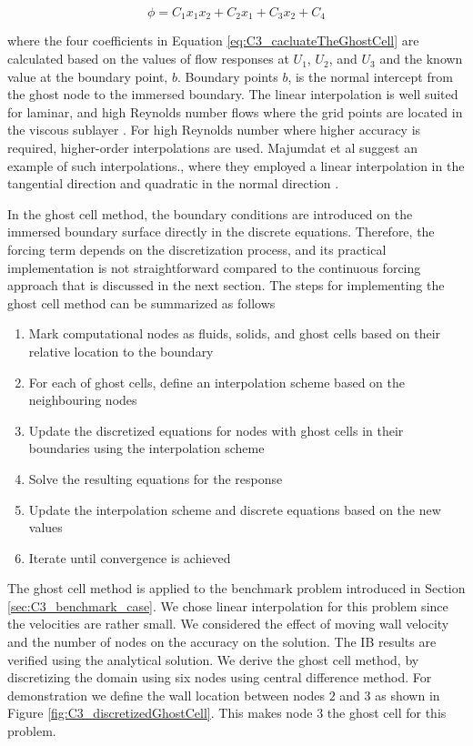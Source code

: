 \begin{equation}\label{eq:C3_cacluateTheGhostCell}
    \phi = C_1 x_1 x_2 + C_2 x_1 + C_3 x_2 + C_4
\end{equation}

where the four coefficients in Equation \eqref{eq:C3_cacluateTheGhostCell} are calculated based on the values of flow responses at $U_1$, $U_2$, and $U_3$ and the known value at the boundary point, $b$. Boundary points $b$, is the normal intercept from the ghost node to the immersed boundary. The linear interpolation is well suited for laminar, and high Reynolds number flows where the grid points are located in the viscous sublayer \cite{iaccarino2003immersed}. For high Reynolds number where higher accuracy is required, higher-order interpolations are used. Majumdat et al suggest an example of such interpolations., where they employed a linear interpolation in the tangential direction and quadratic in the normal direction \cite{majumdar2001rans}. 

In the ghost cell method, the boundary conditions are introduced on the immersed boundary surface directly in the discrete equations. Therefore, the forcing term depends on the discretization process, and its practical implementation is not straightforward compared to the continuous forcing approach that is discussed in the next section. The steps for implementing the ghost cell method can be summarized as follows

\begin{enumerate}
    \item Mark computational nodes as fluids, solids, and ghost cells based on their relative location to the boundary
    \item For each of ghost cells, define an interpolation scheme based on the neighbouring nodes
    \item Update the discretized equations for nodes with ghost cells in their boundaries using the interpolation scheme
    \item Solve the resulting equations for the response
    \item Update the interpolation scheme and discrete equations based on the new values
    \item Iterate until convergence is achieved
\end{enumerate}

The ghost cell method is applied to the benchmark problem introduced in Section \ref{sec:C3_benchmark_case}. We chose linear interpolation for this problem since the velocities are rather small. We considered the effect of moving wall velocity and the number of nodes on the accuracy on the solution. The IB results are verified using the analytical solution. We derive the ghost cell method, by discretizing the domain using six nodes using central difference method. For demonstration we define the wall location between nodes $2$ and $3$ as shown in Figure \ref{fig:C3_discretizedGhostCell}. This makes node $3$ the ghost cell for this problem.

